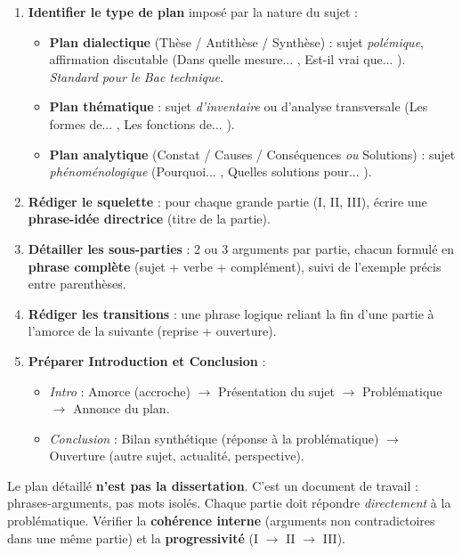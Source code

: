 \documentclass[11pt]{article}
\begin{document}
\begin{methode}
\begin{enumerate}
\item \textbf{Identifier le type de plan} imposé par la nature du sujet :
\begin{itemize}
\item \textbf{Plan dialectique} (Thèse / Antithèse / Synthèse) : sujet \emph{polémique}, affirmation discutable (\og Dans quelle mesure... \fg{}, \og Est-il vrai que... \fg{}). \emph{Standard pour le Bac technique.}
\item \textbf{Plan thématique} : sujet \emph{d'inventaire} ou d'analyse transversale (\og Les formes de... \fg{}, \og Les fonctions de... \fg{}).
\item \textbf{Plan analytique} (Constat / Causes / Conséquences \emph{ou} Solutions) : sujet \emph{phénoménologique} (\og Pourquoi... \fg{}, \og Quelles solutions pour... \fg{}).
\end{itemize}
\item \textbf{Rédiger le squelette} : pour chaque grande partie (I, II, III), écrire une \textbf{phrase-idée directrice} (titre de la partie).
\item \textbf{Détailler les sous-parties} : 2 ou 3 arguments par partie, chacun formulé en \textbf{phrase complète} (sujet + verbe + complément), suivi de l'exemple précis entre parenthèses.
\item \textbf{Rédiger les transitions} : une phrase logique reliant la fin d'une partie à l'amorce de la suivante (reprise + ouverture).
\item \textbf{Préparer Introduction et Conclusion} : 
\begin{itemize}
\item \emph{Intro} : Amorce (accroche) $\rightarrow$ Présentation du sujet $\rightarrow$ Problématique $\rightarrow$ Annonce du plan.
\item \emph{Conclusion} : Bilan synthétique (réponse à la problématique) $\rightarrow$ Ouverture (autre sujet, actualité, perspective).
\end{itemize}
\end{enumerate}
\begin{attention}
Le plan détaillé \textbf{n'est pas la dissertation}. C'est un document de travail : phrases-arguments, pas mots isolés. Chaque partie doit répondre \emph{directement} à la problématique. Vérifier la \textbf{cohérence interne} (arguments non contradictoires dans une même partie) et la \textbf{progressivité} (I $\rightarrow$ II $\rightarrow$ III).
\end{attention}
\end{methode}
\end{document}
